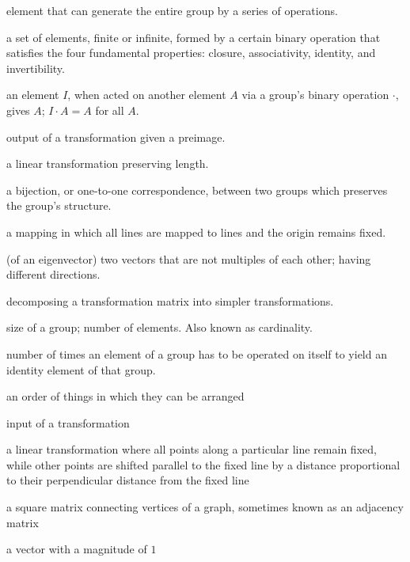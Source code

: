 \documentclass[../gatm.tex]{subfiles}
\begin{document}
\begin{description}[align=left]
\item[generator] element that can generate the entire group by a series of operations.

\item[group] a set of elements, finite or infinite, formed by a certain binary operation that satisfies the four fundamental properties: closure, associativity, identity, and invertibility.

\item[identity element] an element $I$, when acted on another element $A$ via a group's binary operation $\cdot$, gives $A$; $I\cdot A = A$ for all $A$.

\item[image] output of a transformation given a preimage.

\item[isometry] a linear transformation preserving length.

\item[isomorphism] a bijection, or one-to-one correspondence, between two groups which preserves the group's structure.

\item[linear mapping] a mapping in which all lines are mapped to lines and the origin remains fixed.

\item[linearly independent] (of an eigenvector) two vectors that are not multiples of each other; having different directions.

\item[matrix decomposition] decomposing a transformation matrix into simpler transformations.

\item[order] size of a group; number of elements. Also known as cardinality.

\item[period] number of times an element of a group has to be operated on itself to yield an identity element of that group.

\item[permutation] an order of things in which they can be arranged

\item[preimage] input of a transformation

\item[shear] a linear transformation where all points along a particular line remain fixed, while other points are shifted parallel to the fixed line by a distance proportional to their perpendicular distance from the fixed line

\item[transportation matrix] a square matrix connecting vertices of a graph, sometimes known as an adjacency matrix

\item[unit vector] a vector with a magnitude of $1$

\end{description}
\end{document}
